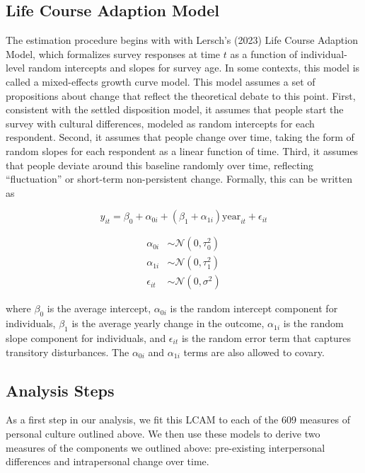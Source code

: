 \documentclass[
  12pt,
]{article}
\begin{document}
\hypertarget{life-course-adaption-model}{%
\subsection{Life Course Adaption
Model}\label{life-course-adaption-model}}

The estimation procedure begins with with Lersch's (2023) Life Course
Adaption Model, which formalizes survey responses at time \(t\) as a
function of individual-level random intercepts and slopes for survey
age. In some contexts, this model is called a mixed-effects growth curve
model. This model assumes a set of propositions about change that
reflect the theoretical debate to this point. First, consistent with the
settled disposition model, it assumes that people start the survey with
cultural differences, modeled as random intercepts for each respondent.
Second, it assumes that people change over time, taking the form of
random slopes for each respondent as a linear function of time. Third,
it assumes that people deviate around this baseline randomly over time,
reflecting ``fluctuation'' or short-term non-persistent change.
Formally, this can be written as

\[
y_{it} = \beta_0 + \alpha_{0i} + (\beta_1 + \alpha_{1i}) \text{year}_{it} + \epsilon_{it}
\]

\[
\begin{aligned}
\alpha_{0i} &\sim \mathcal{N}(0,\tau^2_{0}) \\
\alpha_{1i} &\sim \mathcal{N}(0,\tau^2_{1}) \\
\epsilon_{it} &\sim \mathcal{N}(0,\sigma^2)
\end{aligned}
\]

where \(\beta_0\) is the average intercept, \(\alpha_{0i}\) is the
random intercept component for individuals, \(\beta_1\) is the average
yearly change in the outcome, \(\alpha_{1i}\) is the random slope
component for individuals, and \(\epsilon_{it}\) is the random error
term that captures transitory disturbances. The \(\alpha_{0i}\) and
\(\alpha_{1i}\) terms are also allowed to covary.

\hypertarget{analysis-steps}{%
\subsection{Analysis Steps}\label{analysis-steps}}

As a first step in our analysis, we fit this LCAM to each of the 609
measures of personal culture outlined above. We then use these models to
derive two measures of the components we outlined above: pre-existing
interpersonal differences and intrapersonal change over time.
\end{document}
